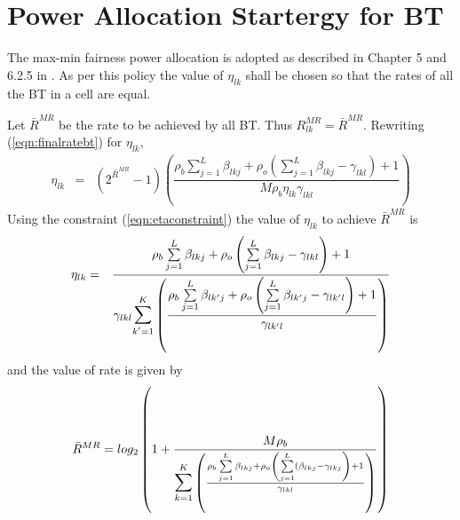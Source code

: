 \documentclass[10pt, a4paper, twoside,fleqn]{article}
\begin{document}
\section{Power Allocation Startergy for BT}
The max-min fairness power allocation is adopted as described in Chapter 5 and 6.2.5 in \cite{bib:MassiveMimoBook}. As per this policy the value of $\eta_{lk}$ shall be chosen so that the rates of all the BT in a cell are equal. 

Let $\bar{R}^{MR}$ be the rate to be achieved by all BT. Thus $R_{lk}^{MR} = \bar{R}^{MR}$. Rewriting (\ref{eqn:finalratebt}) for $\eta_{lk}$,
\begin{eqnarray}
    \eta_{lk} &=& (2^{\bar{R}^{MR}} - 1)\left(\dfrac{\rho_b\sum\limits_{j=1}^{L}\beta_{lkj}+\rho_o\left(\sum\limits_{j=1}^{L}\beta_{lkj} -\gamma_{lkl}\right)+1}{M\rho_b\eta_{lk}\gamma_{lkl}}\right)
\end{eqnarray}
Using the constraint (\ref{eqn:etaconstraint}) the value of $\eta_{lk}$ to achieve $\bar{R}^{MR}$ is
\begin{eqnarray}
    \eta_{lk} &=& \frac{\rho_b\sum\limits_{j=1}^{L}\beta_{lkj}+\rho_o\left(\sum\limits_{j=1}^{L}\beta_{lkj} -\gamma_{lkl}\right)+1}{\gamma_{lkl}\mathlarger{\mathlarger{\sum}}\limits_{k'=1}^{K}\left(\dfrac{\rho_b\sum\limits_{j=1}^{L}\beta_{lk'j}+\rho_o\left(\sum\limits_{j=1}^{L}\beta_{lk'j} -\gamma_{lk'l}\right)+1}{\gamma_{lk'l}}\right)}
\end{eqnarray}
and the value of rate is given by
\begin{eqnarray}
    \bar{R}^{MR} =log_2\left(1+\frac{M\rho_b}{\mathlarger{\mathlarger{\sum}}\limits_{k=1}^{K}\left(\frac{\rho_b\sum\limits_{j=1}^{L}\beta_{lkj}+\rho_o\left(\sum\limits_{j=1}^{L}(\beta_{lkj} -\gamma_{lkj}\right)+1}{\gamma_{lkl}}\right)} \right)
\end{eqnarray}
  
\end{document}
